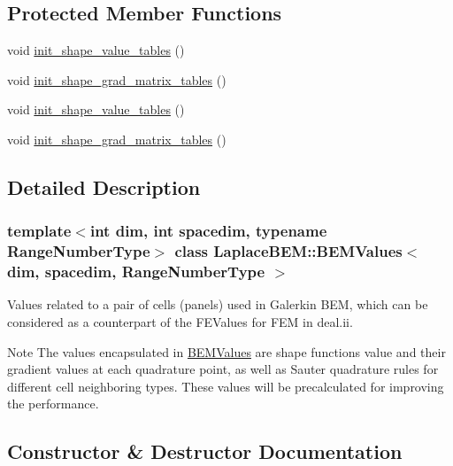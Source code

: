\subsection*{Protected Member Functions}
\begin{DoxyCompactItemize}
\item 
void \hyperlink{classLaplaceBEM_1_1BEMValues_a71328aee0f80bcea63897444b086de99}{init\+\_\+shape\+\_\+value\+\_\+tables} ()
\item 
void \hyperlink{classLaplaceBEM_1_1BEMValues_a5646d3caf1ede82b5dca1f82be893dd4}{init\+\_\+shape\+\_\+grad\+\_\+matrix\+\_\+tables} ()
\item 
void \hyperlink{classLaplaceBEM_1_1BEMValues_a71328aee0f80bcea63897444b086de99}{init\+\_\+shape\+\_\+value\+\_\+tables} ()
\item 
void \hyperlink{classLaplaceBEM_1_1BEMValues_a5646d3caf1ede82b5dca1f82be893dd4}{init\+\_\+shape\+\_\+grad\+\_\+matrix\+\_\+tables} ()
\end{DoxyCompactItemize}


\subsection{Detailed Description}
\subsubsection*{template$<$int dim, int spacedim, typename Range\+Number\+Type$>$\newline
class Laplace\+B\+E\+M\+::\+B\+E\+M\+Values$<$ dim, spacedim, Range\+Number\+Type $>$}

Values related to a pair of cells (panels) used in Galerkin B\+EM, which can be considered as a counterpart of the {\ttfamily F\+E\+Values} for F\+EM in deal.\+ii.


\begin{DoxyDescription}
\item[Note ]The values encapsulated in {\ttfamily \hyperlink{classLaplaceBEM_1_1BEMValues}{B\+E\+M\+Values}} are shape functions value and their gradient values at each quadrature point, as well as Sauter quadrature rules for different cell neighboring types. These values will be precalculated for improving the performance. 
\end{DoxyDescription}

\subsection{Constructor \& Destructor Documentation}
\mbox{\label{classLaplaceBEM_1_1BEMValues_a7095a2e5448fa5478cc2d9affe319abf}} 
